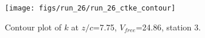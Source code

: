 \begin{figure}[H]
\centering
\texttt{[image: figs/run\_26/run\_26\_ctke\_contour]}
\caption{Contour plot of $k$ at $z/c$=7.75, $V_{free}$=24.86, station 3.}
\label{fig:run_26_ctke_contour}
\end{figure}



